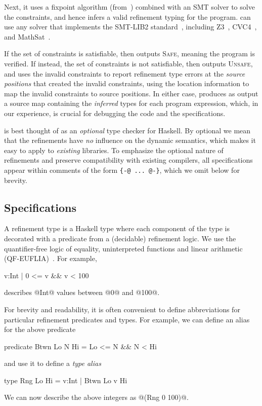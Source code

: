 Next, it uses a fixpoint algorithm (from~\citep{LiquidPLDI08})
combined with an SMT solver to solve the constraints, and hence 
infers a valid refinement typing for the program. 
%
\toolname can use any solver that implements the SMT-LIB2
standard~\cite{SMTLIB2}, including Z3~\citep{z3}, CVC4~\citep{CVC4}, and
MathSat~\citep{MathSat}.

 
If the set of constraints is satisfiable, then \toolname outputs 
\textsc{Safe}, meaning the program is verified.
If instead, the set of constraints is not satisfiable, then \toolname
outputs \textsc{Unsafe}, and uses the invalid constraints to 
report refinement type errors at the \emph{source positions}
that created the invalid constraints, using the location 
information to map the invalid constraints to source positions.
%
In either case, \toolname produces as output a source map
containing the \emph{inferred} types for each program 
expression, which, in our experience, is crucial for 
debugging the code and the specifications.

%
\toolname is best thought of as an \emph{optional} type checker
for Haskell. By optional we mean that the refinements have \emph{no} 
influence on the dynamic semantics, which makes it easy to apply 
\toolname to \emph{existing} libraries.
%
To emphasize the optional nature of refinements and preserve 
compatibility with existing compilers, all specifications 
appear within comments of the form \verb|{-@ ... @-}|, 
which we omit below for brevity.

\subsection{Specifications}

A refinement type is a Haskell type where each component
of the type is decorated with a predicate from a (decidable)
refinement logic. We use the quantifier-free logic of equality, 
uninterpreted functions and linear arithmetic (QF-EUFLIA)~\cite{Nelson81}. 
For example,
%
\begin{code}
   {v:Int | 0 <= v && v < 100}
\end{code}
%
describes @Int@ values between @0@ and @100@.

 For brevity and readability, it is often convenient 
to define abbreviations for particular refinement predicates and types.
For example, we can define an alias for the above predicate
%
\begin{code}
  predicate Btwn Lo N Hi = Lo <= N && N < Hi
\end{code}
%
and use it to define a \emph{type alias}
%
\begin{code}
  type Rng Lo Hi = {v:Int | Btwn Lo v Hi} 
\end{code}
%
We can now describe the above integers as @(Rng 0 100)@.


